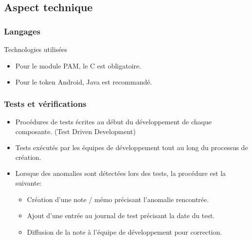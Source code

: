 \documentclass[xcolor=table]{beamer}
\begin{document}
\subsection{Aspect technique}

\begin{frame}
\frametitle{Langages}
\begin{block}{Technologies utilisées}
\begin{itemize}
  \item Pour le module PAM, le C est obligatoire.
  \item Pour le token Android, Java est recommandé. 
\end{itemize}
\end{block}
\end{frame}


\begin{frame}
  \frametitle{Tests et vérifications}
  \begin{itemize}
   \item Procédures de tests écrites au début du développement de chaque composante. (Test Driven Development)
   \item Tests exécutés par les équipes de développement tout au long du processus de création.
   \item  Lorsque des anomalies sont détectées lors des tests, la procédure est la suivante:
    \begin{itemize}
     \item Création d'une note / mémo précisant l'anomalie rencontrée.
     \item Ajout d'une entrée au journal de test précisant la date du test.
     \item Diffusion de la note à l'équipe de développement pour correction.
    \end{itemize}
  \end{itemize}
\end{frame}
\end{document}
